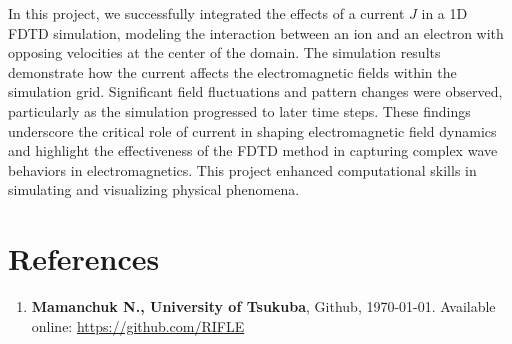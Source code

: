 \documentclass{article}[a4paper]
\begin{document}
In this project, we successfully integrated the effects of a current \( J \) in a 1D FDTD simulation, modeling the interaction between an ion and an electron with opposing velocities at the center of the domain. The simulation results demonstrate how the current affects the electromagnetic fields within the simulation grid. Significant field fluctuations and pattern changes were observed, particularly as the simulation progressed to later time steps. These findings underscore the critical role of current in shaping electromagnetic field dynamics and highlight the effectiveness of the FDTD method in capturing complex wave behaviors in electromagnetics. This project enhanced computational skills in simulating and visualizing physical phenomena.


\section*{References}
\begin{enumerate}
    \item \textbf{Mamanchuk N., University of Tsukuba}, Github, \today. Available online: \url{https://github.com/RIFLE}
\end{enumerate}
\end{document}
